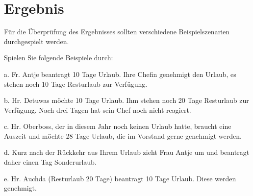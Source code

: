 \section{Ergebnis}
Für die Überprüfung des Ergebnisses sollten verschiedene Beispielszenarien durchgespielt werden.


Spielen Sie folgende Beispiele durch:


a. Fr. Antje beantragt 10 Tage Urlaub. Ihre Chefin genehmigt den Urlaub, es stehen noch 10
Tage Resturlaub zur Verfügung.


b. Hr. Detuwas möchte 10 Tage Urlaub. Ihm stehen noch 20 Tage Resturlaub zur Verfügung.
Nach drei Tagen hat sein Chef noch nicht reagiert.


c. Hr. Oberboss, der in diesem Jahr noch keinen Urlaub hatte, braucht eine Auszeit und möchte
28 Tage Urlaub, die im Vorstand gerne genehmigt werden.


d. Kurz nach der Rückkehr aus Ihrem Urlaub zieht Frau Antje um und beantragt daher einen Tag
Sonderurlaub.


e. Hr. Auchda (Resturlaub 20 Tage) beantragt 10 Tage Urlaub. Diese werden genehmigt.